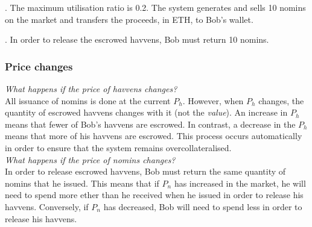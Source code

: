 \begin{center}
\end{center}

. The maximum utilisation ratio is 0.2. The system generates and sells 10 nomins on the market and transfers the proceeds, in ETH, to Bob's wallet. \\

\begin{center}
\end{center}

. In order to release the escrowed havvens, Bob must return 10 nomins.

\begin{center}
\end{center}

\subsubsection{Price changes}

\noindent \emph{What happens if the price of havvens changes?} \\

\noindent All issuance of nomins is done at the current $P_h$. However, when $P_h$ changes, the quantity of escrowed havvens changes with it (not the \emph{value}). An increase in $P_h$ means that fewer of Bob's havvens are escrowed. In contrast, a decrease in the $P_h$ means that more of his havvens are escrowed. This process occurs automatically in order to ensure that the system remains overcollateralised. \\ 

\noindent \emph{What happens if the price of nomins changes?} \\ 

\noindent In order to release escrowed havvens, Bob must return the same quantity of nomins that he issued. This means that if $P_n$ has increased in the market, he will need to spend more ether than he received when he issued in order to release his havvens. Conversely, if $P_n$ has decreased, Bob will need to spend less in order to release his havvens.


